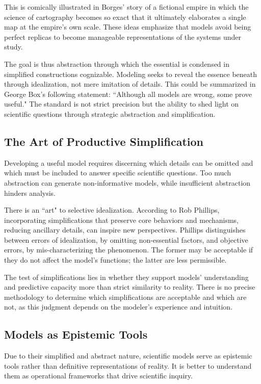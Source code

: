 This is comically illustrated in Borges' story of a fictional empire in which the science of cartography becomes so exact that it ultimately elaborates a single map at the empire's own scale. These ideas emphasize that models avoid being perfect replicas to become manageable representations of the systems under study.

The goal is thus abstraction through which the essential is condensed in simplified constructions cognizable. Modeling seeks to reveal the essence beneath through idealization, not mere imitation of details. This could be summarized in George Box's following statement: ``Although all models are wrong, some prove useful." The standard is not strict precision but the ability to shed light on scientific questions through strategic abstraction and simplification.

\subsection{The Art of Productive Simplification}
Developing a useful model requires discerning which details can be omitted and which must be included to answer specific scientific questions. Too much abstraction can generate non-informative models, while insufficient abstraction hinders analysis.

There is an ``art" to selective idealization. According to Rob Phillips, incorporating simplifications that preserve core behaviors and mechanisms, reducing ancillary details, can inspire new perspectives. Phillips distinguishes between errors of idealization, by omitting non-essential factors, and objective errors, by mis-characterizing the phenomenon. The former may be acceptable if they do not affect the model's functions; the latter are less permissible.

The test of simplifications lies in whether they support models' understanding and predictive capacity more than strict similarity to reality. There is no precise methodology to determine which simplifications are acceptable and which are not, as this judgment depends on the modeler's experience and intuition.

\subsection{Models as Epistemic Tools}
Due to their simplified and abstract nature, scientific models serve as epistemic tools rather than definitive representations of reality. It is better to understand them as operational frameworks that drive scientific inquiry.

